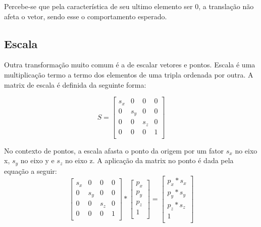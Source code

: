 Percebe-se que pela característica de seu ultimo elemento ser 0, a translação não afeta o vetor, sendo esse o comportamento esperado.

\subsection{Escala}

Outra transformação muito comum é a de escalar vetores e pontos. Escala é uma multiplicação termo a termo dos elementos de uma tripla ordenada por outra. A matrix de escala é definida da seguinte forma:

\begin{equation}
S = 
\begin{bmatrix}
    s_x & 0   & 0   & 0\\
    0   & s_y & 0   & 0\\
    0   & 0   & s_z & 0\\
    0   & 0   & 0   & 1 \\
\end{bmatrix}
\end{equation}

No contexto de pontos, a escala afasta o ponto da origem por um fator $s_x$ no eixo x, $s_y$ no eixo y e $s_z$ no eixo z. A aplicação da matrix no ponto é dada pela equação a seguir:
\begin{equation}
\begin{bmatrix}
    s_x & 0   & 0   & 0\\
    0   & s_y & 0   & 0\\
    0   & 0   & s_z & 0\\
    0   & 0   & 0   & 1 \\
\end{bmatrix}
*
\begin{bmatrix}
    p_x\\
    p_y\\
    p_z\\
    1 \\
\end{bmatrix}
=
\begin{bmatrix}
    p_x * s_x\\
    p_y * s_y\\
    p_z * s_z\\
    1 \\
\end{bmatrix}
\end{equation}


